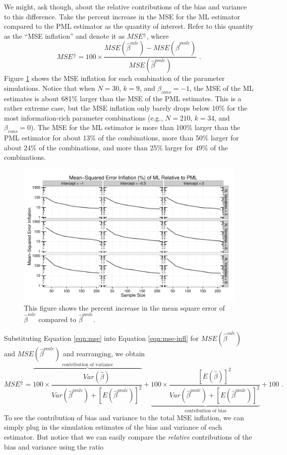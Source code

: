 \documentclass[12pt]{article}
\begin{document}
We might, ask though, about the relative contributions of the bias and variance to this difference. 
Take the percent increase in the MSE for the ML estimator compared to the PML estimator as the quantity of interest. 
Refer to this quantity as the ``MSE inflation'' and denote it as $MSE^\Uparrow$, where 
\begin{equation}\label{eqn:mse-infl}
MSE^\Uparrow = 100 \times \dfrac{MSE(\hat{\beta}^{mle}) - MSE(\hat{\beta}^{pmle})}{MSE(\hat{\beta}^{pmle})}  \text{ .} 
\end{equation}
Figure \ref{fig:mse-infl} shows the MSE inflation for each combination of the parameter simulations. 
Notice that when $N = 30$, $k = 9$, and $\beta_{cons} = -1$, the MSE of the ML estimates is about 681\% larger than the MSE of the PML estimates. 
This is a rather extreme case, but the MSE inflation only barely drops below 10\% for the most information-rich parameter combinations (e.g., $N = 210$, $k = 34$, and $\beta_{cons} = 0$). 
The MSE for the ML estimator is more than 100\% larger than the PML estimator for about 13\% of the combinations, more than 50\% larger for about 24\% of the combinations, and more than 25\% larger for 49\% of the combinations. 
\begin{figure}[H]
\begin{center}
\includegraphics[width = \textwidth]{figs/sims-mse-infl.pdf}
\caption{This figure shows the percent increase in the mean square error of $\hat{\beta}^{mle}$ compared to $\hat{\beta}^{pmle}$.}\label{fig:mse-infl}
\end{center}
\end{figure}
\noindent Substituting Equation \ref{eqn:mse} into Equation \ref{eqn:mse-infl} for $MSE(\hat{\beta}^{mle})$ and $MSE(\hat{\beta}^{pmle})$ and rearranging, we obtain
\begin{equation}
MSE^\Uparrow = \overbrace{100 \times \dfrac{Var(\hat{\beta})}{Var(\hat{\beta}^{pmle}) + [E(\hat{\beta}^{pmle})]^2}}^{\text{contribution of variance}} + \underbrace{100 \times \dfrac{[E(\hat{\beta})]^2}{Var(\hat{\beta}^{pmle}) + [E(\hat{\beta}^{pmle})]^2}}_{\text{contribution of bias}}  + 100 \text{ .} \nonumber
\end{equation}
\noindent To see the contribution of bias and variance to the total MSE inflation, we can simply plug in the simulation estimates of the bias and variance of each estimator. But notice that we can easily compare the \textit{relative} contributions of the bias and variance using the ratio 
\end{document}
